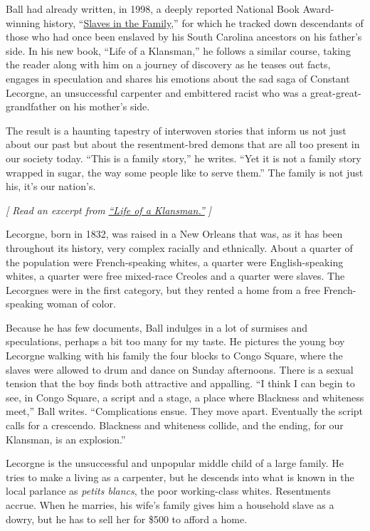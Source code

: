 Ball had already written, in 1998, a deeply reported National Book
Award-winning history,
``\href{https://www.nytimes.com/1998/03/01/books/skeletons-in-the-family-closet.html?searchResultPosition=1}{Slaves
in the Family},'' for which he tracked down descendants of those who had
once been enslaved by his South Carolina ancestors on his father's side.
In his new book, ``Life of a Klansman,'' he follows a similar course,
taking the reader along with him on a journey of discovery as he teases
out facts, engages in speculation and shares his emotions about the sad
saga of Constant Lecorgne, an unsuccessful carpenter and embittered
racist who was a great-great-grandfather on his mother's side.

The result is a haunting tapestry of interwoven stories that inform us
not just about our past but about the resentment-bred demons that are
all too present in our society today. ``This is a family story,'' he
writes. ``Yet it is not a family story wrapped in sugar, the way some
people like to serve them.'' The family is not just his, it's our
nation's.

\emph{{[} Read an excerpt from}
\href{https://www.nytimes.com/2020/08/04/books/review/life-of-a-klansman-by-edward-ball-an-excerpt.html}{\emph{``Life
of a Klansman.''}} \emph{{]}}

Lecorgne, born in 1832, was raised in a New Orleans that was, as it has
been throughout its history, very complex racially and ethnically. About
a quarter of the population were French-speaking whites, a quarter were
English-speaking whites, a quarter were free mixed-race Creoles and a
quarter were slaves. The Lecorgnes were in the first category, but they
rented a home from a free French-speaking woman of color.

Because he has few documents, Ball indulges in a lot of surmises and
speculations, perhaps a bit too many for my taste. He pictures the young
boy Lecorgne walking with his family the four blocks to Congo Square,
where the slaves were allowed to drum and dance on Sunday afternoons.
There is a sexual tension that the boy finds both attractive and
appalling. ``I think I can begin to see, in Congo Square, a script and a
stage, a place where Blackness and whiteness meet,'' Ball writes.
``Complications ensue. They move apart. Eventually the script calls for
a crescendo. Blackness and whiteness collide, and the ending, for our
Klansman, is an explosion.''

Lecorgne is the unsuccessful and unpopular middle child of a large
family. He tries to make a living as a carpenter, but he descends into
what is known in the local parlance as \emph{petits blancs}, the poor
working-class whites. Resentments accrue. When he marries, his wife's
family gives him a household slave as a dowry, but he has to sell her
for \$500 to afford a home.

